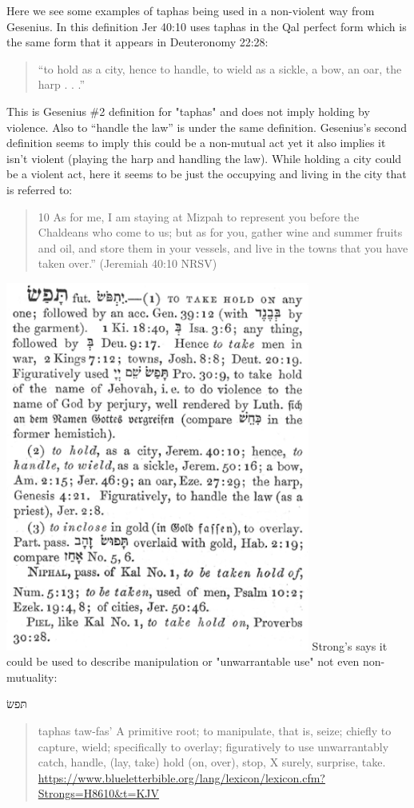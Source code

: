 \documentclass[11pt]{article}
\begin{document}
Here we see some examples of taphas being used in a non-violent way from Gesenius. In this definition Jer 40:10 uses taphas in the Qal perfect form which is the same form that it appears in Deuteronomy 22:28:
\begin{quote}
“to hold as a city, hence to handle, to wield as a sickle, a bow, an oar, the harp . . .” 
\end{quote}
This is Gesenius \#2 definition for "taphas" and does not imply holding by violence. Also to “handle the law” is under the same definition. Gesenius’s second definition seems to imply this could be a non-mutual act yet it also implies it isn't violent (playing the harp and handling the law). While holding a city could be a violent act, here it seems to be just the occupying and living in the city that is referred to:
\begin{quote}
10 As for me, I am staying at Mizpah to represent you before the Chaldeans who come to us; but as for you, gather wine and summer fruits and oil, and store them in your vessels, and live in the towns that you have taken over.” (Jeremiah 40:10 NRSV)
\end{quote}

\includegraphics[width=10cm]{taphas}
\newline
Strong’s says it could be used to describe manipulation or "unwarrantable use" not even non-mutuality:

 \begin{hebrew} תּפשׂ  \end{hebrew}
\begin{quote}
taphas \newline
taw-fas' \newline
A primitive root; to manipulate, that is, seize; chiefly to capture, wield; specifically to overlay; figuratively to use unwarrantably
 catch, handle, (lay, take) hold (on, over), stop, X surely, surprise, take. \newline
\url{https://www.blueletterbible.org/lang/lexicon/lexicon.cfm?Strongs=H8610&t=KJV}
\end{quote}
\end{document}
